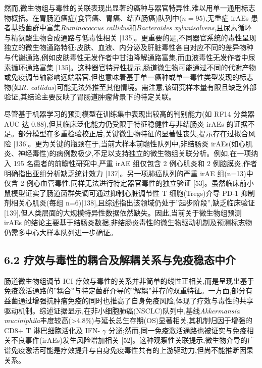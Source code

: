 然而,微生物组与毒性的关联表现出显著的癌种与器官特异性,难以用单一通用标志物概括。在胃肠道癌症(食管癌、胃癌、结直肠癌)队列中(\(n=95)\),无重症 irAEs 患者基线菌群中富集\emph{Ruminococcus callidus}和\emph{Bacteroides xylanisolvens},且尿素循环与精氨酸生物合成通路与低毒性相关 {[}135{]}。更重要的是,不同器官系统的毒性呈现独立的微生物通路特征:皮肤、血液、内分泌及肝脏毒性各自对应不同的差异物种与代谢通路,例如皮肤毒性无发作者中甘油降解通路富集,而血液毒性无发作者中尿素循环通路富集 {[}135{]}。这种器官特异性提示,肠道微生物可能通过不同的代谢产物或免疫调节轴影响远端器官,但也意味着基于单一癌种或单一毒性类型发现的标志物(如\emph{R. callidus})可能无法外推至其他情境。需注意,该研究样本量有限且缺乏外部验证,其结论主要反映了胃肠道肿瘤背景下的特定关联。

尽管基于机器学习的预测模型在训练集中表现出较高的判别能力(如 RF14 分类器 AUC 达 0.88),但其临床泛化能力仍受限于特征稳健性与非结肠炎 irAEs 的证据不足。部分模型在多重检验校正后,关键微生物特征的显著性丧失,提示存在过拟合风险 {[}136{]}。更为关键的瓶颈在于,当前大样本前瞻性队列中,非结肠炎 irAEs(如心肌炎、神经毒性)的病例数极少,不足以支持独立的微生物组关联分析。例如,在一项纳入 195 名患者的前瞻性研究中,严重 irAE 组仅包含 2 例心肌炎和 2 例脑膜炎,作者明确指出亚组分析缺乏统计效力 {[}137{]}。另一项肺癌队列的严重 irAE 组(n=13)中仅含 2 例心血管毒性,同样无法进行特定器官毒性的独立验证 {[}53{]}。虽然临床前小鼠模型证实了肠道菌群失调可通过抑制心脏调节性 T 细胞(Tregs)介导 PD-1 抑制剂相关心肌炎(每组 n=6){[}138{]},且综述指出该领域仍处于''起步阶段'',缺乏临床验证 {[}139{]},但人类层面的大规模特异性数据依然缺失。因此,当前关于微生物组预测 irAEs 的结论主要基于结肠炎数据,非结肠炎毒性的微生物驱动机制及预测标志物仍需多中心大样本队列进一步确证。

\subsection{6.2 疗效与毒性的耦合及解耦关系与免疫稳态中介}\label{ux7597ux6548ux4e0eux6bd2ux6027ux7684ux8026ux5408ux53caux89e3ux8026ux5173ux7cfbux4e0eux514dux75abux7a33ux6001ux4e2dux4ecb}

肠道微生物组调节 ICI 疗效与毒性的关系并非简单的线性正相关,而是呈现出基于免疫激活通路的''耦合''与特定菌群介导的''解耦''并存的双重特征。一方面,部分有益菌通过增强抗肿瘤免疫的同时也推高了自身免疫风险,体现了疗效与毒性的共享驱动机制。综述证据显示,在非小细胞肺癌(NSCLC)队列中,基线\emph{Akkermansia muciniphila}丰度较高(\textgreater4.8\%)与延长总生存期(OS)显著相关,其机制归因于增强的 CD8+ T 淋巴细胞活化及 IFN- \(\gamma\) 分泌;然而,同一免疫激活通路也被证实与免疫相关不良事件(irAEs)发生风险增加相关 {[}52{]}。这种观察性关联提示,微生物介导的广谱免疫激活可能是疗效提升与自身免疫毒性共有的上游驱动力,但尚不能推断因果关系。

